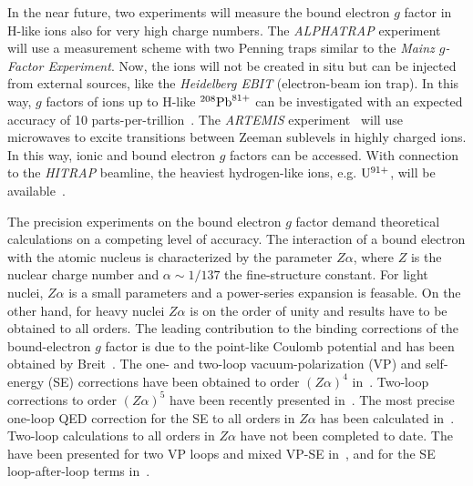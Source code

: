 In the near future, two experiments will measure the bound electron $g$ factor in H-like ions also for very high charge numbers. The \textit{ALPHATRAP} experiment~\cite{sturm2017} will use a measurement scheme with two Penning traps similar to the \textit{Mainz $g$-Factor Experiment}. Now, the ions will not be created in situ but can be injected from external sources, like the \textit{Heidelberg EBIT} (electron-beam ion trap). In this way, $g$ factors of ions up to H-like $^{208}\rm{Pb}^{81+}$ can be investigated with an expected accuracy of 10 parts-per-trillion~\cite{sturm2017}. The \textit{ARTEMIS} experiment~\cite{vogel2013,sturm2017} will use microwaves to excite transitions between Zeeman sublevels in highly charged ions. In this way, ionic and bound electron $g$ factors can be accessed. With connection to the \textit{HITRAP} beamline, the heaviest hydrogen-like ions, e.g. $\rm{U}^{91+}$, will be available~\cite{vogel2015}.

The precision experiments on the bound electron $g$ factor demand theoretical calculations on a competing level of accuracy. The interaction of a bound electron with the atomic nucleus is characterized by the parameter $Z\alpha$, where $Z$ is the nuclear charge number and $\alpha \sim 1/137$ the fine-structure constant. For light nuclei, $Z\alpha$ is a small parameters and a power-series expansion is feasable. On the other hand, for heavy nuclei $Z\alpha$ is on the order of unity and results have to be obtained to all orders. %
The leading contribution to the binding corrections of the bound-electron $g$ factor is due to the point-like Coulomb potential and has been obtained by Breit~\cite{breit1928}.
The one- and two-loop vacuum-polarization (VP) and self-energy (SE) corrections have been obtained to order $(Z\alpha)^4$ in~\cite{karshenboim2000,Pachucki2004,pachucki2004_err,Pachucki2005}. 
Two-loop corrections to order $(Z\alpha)^5$ have been recently presented in~\cite{czarnecki2018}.
The most precise one-loop QED correction for the SE to all orders in $Z\alpha$ has been calculated in~\cite{yerokhin2017}.
Two-loop calculations to all orders in $Z\alpha$ have not been completed to date. The have been presented for two VP loops and mixed VP-SE in~\cite{yerokhin2013}, and for the SE loop-after-loop terms in~\cite{sikora2018_arxiv}.

